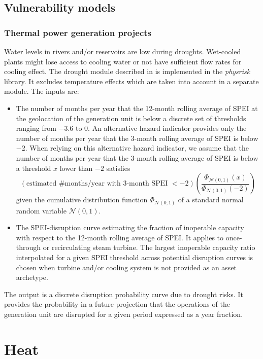 \documentclass[a4paper,11pt]{extarticle} %
\theoremstyle{definition}
\begin{document}
\subsection{Vulnerability models}

\subsubsection{Thermal power generation projects}
Water levels in rivers and/or reservoirs are low during droughts. Wet-cooled plants might lose access to cooling water or not have sufficient flow rates for cooling effect. The drought module described in \cite{LuoEtAl:2021,LuoEtAl:2023} is implemented in the \emph{physrisk} library. It excludes temperature effects which are taken into account in a separate module. The inputs are:
\begin{itemize}
\item The number of months per year that the 12-month rolling average of SPEI at the geolocation of the generation unit is below a discrete set of thresholds ranging from $-3.6$ to $0$. An alternative hazard indicator provides only the number of months per year that the 3-month rolling average of SPEI is below $-2$. When relying on this alternative hazard indicator, we assume that the number of months per year that the 3-month rolling average of SPEI is below a threshold $x$ lower than $-2$ satisfies
$$
\left(\text{estimated \#months/year with 3-month SPEI $<-2$}\right)\left(\frac{\Phi_{\mathcal{N}\left(0,1\right)}\left(x\right)}{\Phi_{\mathcal{N}\left(0,1\right)}\left(-2\right)}\right)
$$
given the cumulative distribution function $\Phi_{\mathcal{N}\left(0,1\right)}$ of a standard normal random variable $\mathcal{N}\left(0,1\right)$.
\item The SPEI-disruption curve estimating the fraction of inoperable capacity with respect to the 12-month rolling average of SPEI. It applies to once-through or recirculating steam turbine. The largest inoperable capacity ratio interpolated for a given SPEI threshold across potential disruption curves is chosen when turbine and/or cooling system is not provided as an asset archetype.
\end{itemize}
The output is a discrete disruption probability curve due to drought risks. It provides the probability in a future projection that the operations of the generation unit are disrupted for a given period expressed as a year fraction.

\section{Heat}
\end{document}
